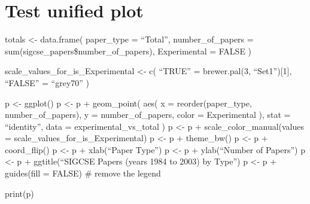 \section{Test unified plot}\label{test-unified-plot}

totals \textless{}- data.frame( paper\_type = ``Total'', number\_of\_papers = sum(sigcse\_papers\$number\_of\_papers), Experimental = FALSE )

scale\_values\_for\_is\_Experimental \textless{}- c( ``TRUE'' = brewer.pal(3, ``Set1''){[}1{]}, ``FALSE'' = ``grey70'' )

p \textless{}- ggplot() p \textless{}- p + geom\_point( aes( x = reorder(paper\_type, number\_of\_papers), y = number\_of\_papers, color = Experimental ), stat = ``identity'', data = experimental\_vs\_total ) p \textless{}- p + scale\_color\_manual(values = scale\_values\_for\_is\_Experimental) p \textless{}- p + theme\_bw() p \textless{}- p + coord\_flip() p \textless{}- p + xlab(``Paper Type'') p \textless{}- p + ylab(``Number of Papers'') p \textless{}- p + ggtitle(``SIGCSE Papers (years 1984 to 2003) by Type'') p \textless{}- p + guides(fill = FALSE) \# remove the legend

print(p)

